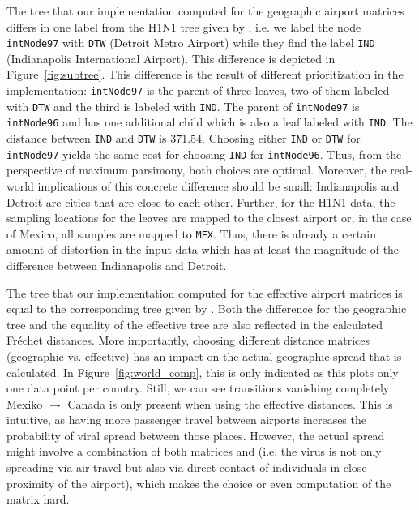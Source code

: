 \documentclass{article}
\begin{document}
The tree that our implementation computed for the geographic airport matrices
differs in one label from the H1N1 tree given by
\cite{reimeringPhylogeographicReconstructionUsing2020}, i.e. we label the node
\texttt{intNode97} with \texttt{DTW} (Detroit Metro Airport) while they find the label
\texttt{IND} (Indianapolis International Airport). This difference is depicted
in Figure~\ref{fig:subtree}.
This difference is the result of different prioritization in the implementation:
\texttt{intNode97} is the parent of three leaves, two of them labeled with
\texttt{DTW} and the third is labeled with \texttt{IND}. The parent of
\texttt{intNode97} is \texttt{intNode96} and has one additional child which is
also a leaf labeled with \texttt{IND}. The distance between \texttt{IND}
and \texttt{DTW} is $371.54$. Choosing either \texttt{IND} or \texttt{DTW} for
\texttt{intNode97} yields the same cost for choosing \texttt{IND} for
\texttt{intNode96}. Thus, from the perspective of maximum parsimony, both
choices are optimal. Moreover, the real-world implications of this concrete
difference should be small: Indianapolis and Detroit are cities that are close
to each other. Further, for the H1N1 data,  the sampling locations for the
leaves are mapped to the closest airport or, in the case of Mexico, all samples 
are mapped to \texttt{MEX}. Thus, there is already a certain amount of
distortion in the input data \cite{reimeringDistanceMatricesParsimonious2019} 
which has at least the magnitude of the difference between Indianapolis and
Detroit.

The tree that our implementation computed for the effective airport matrices is
equal to the corresponding tree given by
\cite{reimeringPhylogeographicReconstructionUsing2020}. Both the difference for
the geographic tree and the equality of the effective tree are also reflected in
the calculated Fr\'{e}chet distances. More importantly, choosing different
distance matrices (geographic vs. effective) has an impact on the actual
geographic spread that is calculated. In Figure~\ref{fig:world_comp}, this is
only indicated as this plots only one data point per country. Still, we can see
transitions vanishing completely: Mexiko $\rightarrow$ Canada is only present
when using the effective distances. This is intuitive, as having more passenger
travel between airports increases the probability of viral spread between those
places. However, the actual spread might involve a combination of both matrices
and (i.e. the virus is not only spreading via air travel but also via direct
contact of individuals in close proximity of the airport), which makes the
choice or even computation of the matrix hard.
\end{document}
